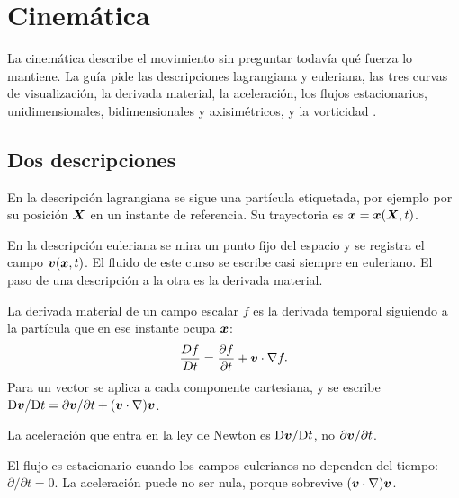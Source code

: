 \chapter{Cinemática}
\label{ch:cinematica}

La cinemática describe el movimiento sin preguntar todavía qué fuerza lo mantiene. La guía pide las descripciones lagrangiana y euleriana, las tres curvas de visualización, la derivada material, la aceleración, los flujos estacionarios, unidimensionales, bidimensionales y axisimétricos, y la vorticidad \parencite{uleGuia2026}.

\section{Dos descripciones}

En la descripción lagrangiana se sigue una partícula etiquetada, por ejemplo por su posición \(\boldsymbol{X}\) en un instante de referencia. Su trayectoria es \(\boldsymbol{x}=\boldsymbol{x}(\boldsymbol{X},t)\).

En la descripción euleriana se mira un punto fijo del espacio y se registra el campo \(\boldsymbol{v}(\boldsymbol{x},t)\). El fluido de este curso se escribe casi siempre en euleriano. El paso de una descripción a la otra es la derivada material.

\begin{definitionbox}
La derivada material de un campo escalar \(f\) es la derivada temporal siguiendo a la partícula que en ese instante ocupa \(\boldsymbol{x}\):
\begin{equation}
\label{eq:material}
\frac{Df}{Dt}=\frac{\partial f}{\partial t}+\boldsymbol{v}\cdot\nabla f.
\end{equation}
Para un vector se aplica a cada componente cartesiana, y se escribe \(\mathrm{D}\boldsymbol{v}/\mathrm{D}t=\partial\boldsymbol{v}/\partial t+(\boldsymbol{v}\cdot\nabla)\boldsymbol{v}\).
\end{definitionbox}

La aceleración que entra en la ley de Newton es \(\mathrm{D}\boldsymbol{v}/\mathrm{D}t\), no \(\partial\boldsymbol{v}/\partial t\).

\begin{definitionbox}
El flujo es estacionario cuando los campos eulerianos no dependen del tiempo: \(\partial/\partial t=0\). La aceleración puede no ser nula, porque sobrevive \((\boldsymbol{v}\cdot\nabla)\boldsymbol{v}\).
\end{definitionbox}

